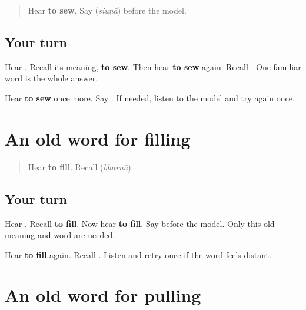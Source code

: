 \label{lesson:PA-R163-sew-again}



\begin{quote}
Hear \textbf{to sew}. Say \textbf{} (\emph{siuṇā}) before the model.
\end{quote}

\subsection*{Your turn}
Hear \textbf{}. Recall its meaning, \textbf{to sew}. Then hear \textbf{to sew} again. Recall \textbf{}. One familiar word is the whole answer.

\begin{tcolorbox}[breakable,colback=teal!4,colframe=teal!35!black,title={Before you move on}]
Hear \textbf{to sew} once more. Say \textbf{}. If needed, listen to the model and try again once.
\end{tcolorbox}
\section[\texorpdfstring{\pa{ਭਰਨਾ} (bharnā)}{ਭਰਨਾ (bharnā)}]{An old word for filling}

\label{lesson:PA-R163-fill-again}



\begin{quote}
Hear \textbf{to fill}. Recall \textbf{} (\emph{bharnā}).
\end{quote}

\subsection*{Your turn}
Hear \textbf{}. Recall \textbf{to fill}. Now hear \textbf{to fill}. Say \textbf{} before the model. Only this old meaning and word are needed.

\begin{tcolorbox}[breakable,colback=teal!4,colframe=teal!35!black,title={Before you move on}]
Hear \textbf{to fill} again. Recall \textbf{}. Listen and retry once if the word feels distant.
\end{tcolorbox}
\section[\texorpdfstring{\pa{ਖਿੱਚਣਾ} (khiccṇā)}{ਖਿੱਚਣਾ (khiccṇā)}]{An old word for pulling}

